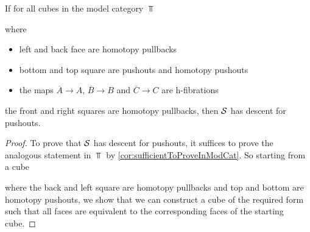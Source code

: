 \begin{prop}\label{prop:reductionStepDescent}
    If for all cubes in the model category $\Top$
    \begin{center}
    \end{center}
    where 
    \begin{itemize}
        \item left and back face are homotopy pullbacks
        \item bottom and top square are pushouts and homotopy pushouts %
        \item the maps $\overline{A}\to A$, $\overline{B}\to B$ and $\overline{C}\to C$ are h-fibrations
    \end{itemize}
    the front and right squares are homotopy pullbacks, then $\mathcal{S}$ has descent for pushouts.
    \begin{proof}
        To prove that $\mathcal{S}$ has descent for pushouts, it suffices to prove the analogous statement in $\Top$ by \cref{cor:sufficientToProveInModCat}.
        So starting from a cube 
        \begin{center}
        \end{center}
        where the back and left square are homotopy pullbacks and top and bottom are homotopy pushouts, we show that we can construct a cube of the required form such that all faces are equivalent to the corresponding faces of the starting cube.
        

\end{proof}
\end{prop}
